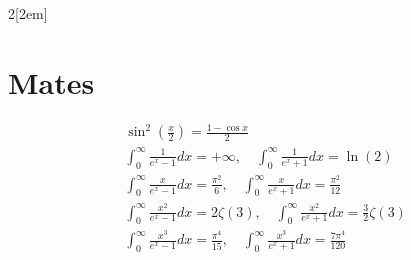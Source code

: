 \documentclass[leqno]{article}
\begin{document}
\begin{multicols}{2}[\columnsep2em]
\section{Mates}
\begin{align*}
&\sin^2 \left(\frac{x}{2}\right) = \frac{1-\cos x}{2}\\
&\int_0^\infty \frac{1}{e^x-1}dx = +\infty, \quad \int_0^\infty \frac{1}{e^x+1}dx = \ln(2)\\
&\int_0^\infty \frac{x}{e^x-1}dx = \frac{\pi^2}{6}, \quad \int_0^\infty \frac{x}{e^x+1}dx = \frac{\pi^2}{12} \\
&\int_0^\infty \frac{x^2}{e^x-1}dx = 2\zeta(3), \quad \int_0^\infty \frac{x^2}{e^x+1}dx = \frac{3}{2}\zeta(3)\\
&\int_0^\infty \frac{x^3}{e^x-1}dx = \frac{\pi^4}{15}, \quad \int_0^\infty \frac{x^3}{e^x+1}dx = \frac{7\pi^4}{120} 
\end{align*}

\end{multicols}
\end{document}
